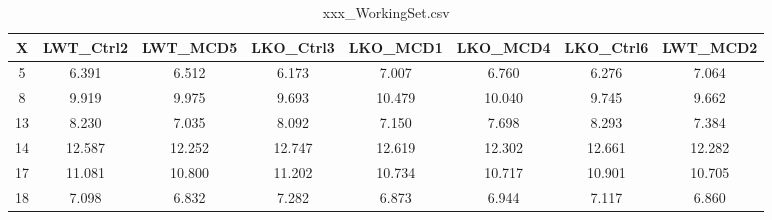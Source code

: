 \documentclass{article}
\begin{document}
\begin{table}[]

\centering
\caption{xxx\_WorkingSet.csv}
\label{my-label}
\begin{tabular}{|c|c|c|c|c|c|c|c|}
\hline
\textbf{X} & \textbf{LWT\_Ctrl2} & \textbf{LWT\_MCD5} & \textbf{LKO\_Ctrl3} & \textbf{LKO\_MCD1} & \textbf{LKO\_MCD4} & \textbf{LKO\_Ctrl6} & \textbf{LWT\_MCD2} \\ \hline
5 & 6.391 & 6.512 & 6.173 & 7.007 & 6.760 & 6.276 & 7.064 \\ \hline
8 & 9.919 & 9.975 & 9.693 & 10.479 & 10.040 & 9.745 & 9.662 \\ \hline
13 & 8.230 & 7.035 & 8.092 & 7.150 & 7.698 & 8.293 & 7.384 \\ \hline
14 & 12.587 & 12.252 & 12.747 & 12.619 & 12.302 & 12.661 & 12.282 \\ \hline
17 & 11.081 & 10.800 & 11.202 & 10.734 & 10.717 & 10.901 & 10.705 \\ \hline
18 & 7.098 & 6.832 & 7.282 & 6.873 & 6.944 & 7.117 & 6.860 \\ \hline
\end{tabular}
\end{table}
\end{document}
